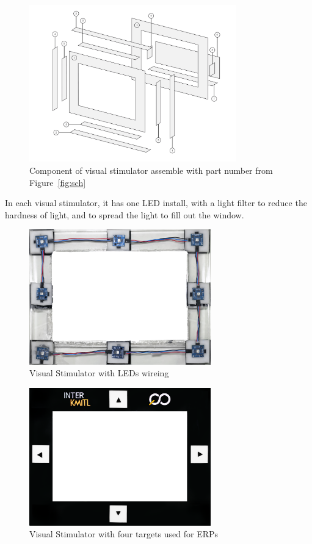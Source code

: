 \begin{figure}[ht]
	\centering
	\includegraphics[width=0.8\textwidth]{chapter6/component.pdf}
	\caption{Component of visual stimulator assemble with part number from Figure~\ref{fig:sch} }
\end{figure}

In each visual stimulator, it has one LED install, with a light filter to reduce the hardness of light, and to spread the light to fill out the window.
\begin{figure}[ht]
	\centering
	\includegraphics[width=0.7\textwidth]{chapter6/frame_LED.jpg}
	\caption{Visual Stimulator with LEDs wireing}
\end{figure}
\begin{figure}[ht]
	\centering
	\includegraphics[width=0.7\textwidth]{chapter7/frame_4.jpg}
	\caption{Visual Stimulator with four targets used for ERPs}
\end{figure}

